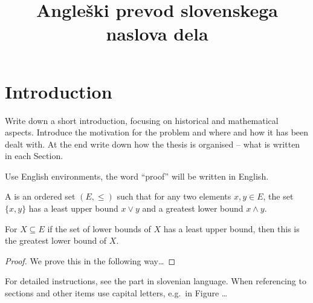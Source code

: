 \documentclass[trst2, tisk]{fmfdelo}
\title{Angleški prevod slovenskega naslova dela}
\begin{document}
\section{Introduction}
Write down a short introduction, focusing on historical and mathematical aspects. Introduce the
motivation for the problem and where and how it has been dealt with. At the end write down how the
thesis is organised -- what is written in each Section.

Use English environments, the word ``proof'' will be written in English.
\begin{definition}
A \emph{} is an ordered set $(E, \leq)$ such that for any two elements $x,y \in E$,
the set $\{x,y\}$ has a least upper bound $x \vee y$ and a greatest lower bound $x \wedge y$.
\end{definition}

\begin{theorem}
For $X \subseteq E$ if the set of lower bounds of $X$ has a least upper bound, then this is the
greatest lower bound of $X$.
\end{theorem}

\begin{proof}
We prove this in the following way\dots
\end{proof}

For detailed instructions, see the part in slovenian language. When referencing to sections and
other items use capital letters, e.g.\ in Figure \dots

\end{document}

